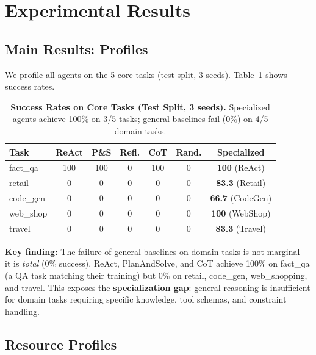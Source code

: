 \documentclass[letterpaper, 10 pt, conference]{ieeeconf}
\begin{document}
\section{Experimental Results}
\label{sec:results}

\subsection{Main Results: Profiles}
\label{sec:main_results}

We profile all agents on the 5 core tasks (test split, 3 seeds). Table~\ref{tab:main_results} shows success rates.

\begin{table}[t]
\centering
\caption{\textbf{Success Rates on Core Tasks (Test Split, 3 seeds).} Specialized agents achieve 100\% on 3/5 tasks; general baselines fail (0\%) on 4/5 domain tasks.}
\label{tab:main_results}
\footnotesize
\setlength{\tabcolsep}{3pt}
\begin{tabular}{lcccccc}
\toprule
\textbf{Task} & \textbf{ReAct} & \textbf{P\&S} & \textbf{Refl.} & \textbf{CoT} & \textbf{Rand.} & \textbf{Specialized} \\
\midrule
fact\_qa & 100 & 100 & 0 & 100 & 0 & \textbf{100} (ReAct) \\
retail & 0 & 0 & 0 & 0 & 0 & \textbf{83.3} (Retail) \\
code\_gen & 0 & 0 & 0 & 0 & 0 & \textbf{66.7} (CodeGen) \\
web\_shop & 0 & 0 & 0 & 0 & 0 & \textbf{100} (WebShop) \\
travel & 0 & 0 & 0 & 0 & 0 & \textbf{83.3} (Travel) \\
\bottomrule
\end{tabular}
\vspace{-2mm}
\end{table}

\textbf{Key finding:} The failure of general baselines on domain tasks is not marginal --- it is \textit{total} (0\% success). ReAct, PlanAndSolve, and CoT achieve 100\% on fact\_qa (a QA task matching their training) but 0\% on retail, code\_gen, web\_shopping, and travel. This exposes the \textbf{specialization gap}: general reasoning is insufficient for domain tasks requiring specific knowledge, tool schemas, and constraint handling.

\subsection{Resource Profiles}
\label{sec:resource_profiles}
\end{document}

